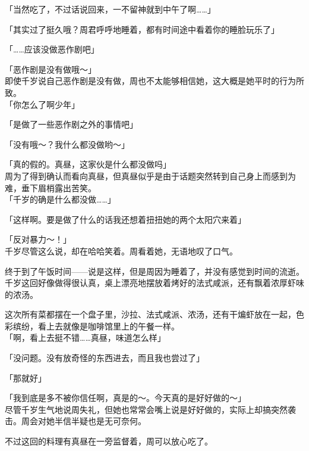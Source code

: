 「当然吃了，不过话说回来，一不留神就到中午了啊……」

「其实过了挺久哦？周君呼呼地睡着，都有时间途中看着你的睡脸玩乐了」

「……应该没做恶作剧吧」

「恶作剧是没有做哦～」\\

即使千岁说自己恶作剧是没有做，周也不太能够相信她，这大概是她平时的行为所致。\\

「你怎么了啊少年」

「是做了一些恶作剧之外的事情吧」

「没有哦～？我什么都没做哟～」

「真的假的。真昼，这家伙是什么都没做吗」\\

周为了得到确认而看向真昼，但真昼似乎是由于话题突然转到自己身上而感到为难，垂下眉梢露出苦笑。\\

「千岁的确是什么都没做……」

「这样啊。要是做了什么的话我还想着扭扭她的两个太阳穴来着」

「反对暴力～！」\\

千岁尽管这么说，却在哈哈笑着。周看着她，无语地叹了口气。\\

\vspace{2\baselineskip}

终于到了午饭时间——说是这样，但是周因为睡着了，并没有感觉到时间的流逝。\\

千岁这回好像做得很认真，桌上漂亮地摆放着烤好的法式咸派，还有飘着浓厚虾味的浓汤。

这次所有菜都摆在一个盘子里，沙拉、法式咸派、浓汤，还有干煸虾放在一起，色彩缤纷，看上去就像是咖啡馆里上的午餐一样。\\

「啊，看上去挺不错……真昼，味道怎么样」

「没问题。没有放奇怪的东西进去，而且我也尝过了」

「那就好」

「我到底是多不被你信任啊，真是的～。今天真的是好好做的～」\\

尽管千岁生气地说周失礼，但她也常常会嘴上说是好好做的，实际上却搞突然袭击。周会对她半信半疑也是无可奈何。

不过这回的料理有真昼在一旁监督着，周可以放心吃了。\\

